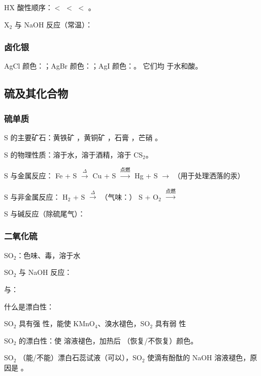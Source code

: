 HX 酸性顺序：\sbl $<$ \sbl $<$ \sbl $<$ \sbl 。

X$_2$ 与 NaOH 反应（常温）：\lbl

\subsubsection{卤化银}
AgCl 颜色：\sbl ；AgBr 颜色：\sbl ；AgI 颜色：\sbl 。
它们均 \sbl 于水和酸。

\subsection{硫及其化合物}

\subsubsection{硫单质}

S 的主要矿石：黄铁矿 \sbl ，黄铜矿 \sbl ，石膏 \sbl ，芒硝 \sbl 。

S 的物理性质：\sbl 溶于水，\sbl 溶于酒精，\sbl 溶于 CS$_2$。

S 与金属反应：
Fe + S $\xrightarrow{\Delta}$ \sbl
Cu + S $\xrightarrow{\text{点燃}}$ \sbl
Hg + S $\rightarrow$ \sbl （用于处理洒落的汞）

S 与非金属反应：
H$_2$ + S $\xrightarrow{\Delta}$ \sbl （气味：\sbl ）
S + O$_2$ $\xrightarrow{\text{点燃}}$ \sbl

S 与碱反应（除硫尾气）：

\subsubsection{二氧化硫}

SO$_2$：\sbl 色\sbl 味、\sbl 毒，\sbl 溶于水

SO$_2$ 与 NaOH 反应：


与：


什么是漂白性：

SO$_2$ 具有强 \sbl 性，能使 KMnO$_4$、溴水褪色，SO$_2$ 具有弱 \sbl 性

SO$_2$ 的漂白性：使 \sbl 溶液褪色，加热后 \sbl （恢复/不恢复）颜色。

SO$_2$ \sbl （能/不能）漂白石蕊试液（\sbl 可以），SO$_2$ 使滴有酚酞的 NaOH 溶液褪色，原因是 \sbl 。


